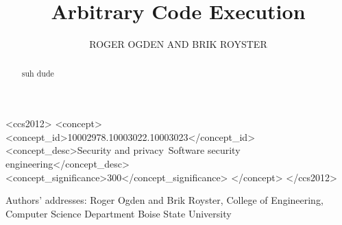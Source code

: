 \documentclass{acmsmall}
\begin{document}

\title{Arbitrary Code Execution}
\author{ROGER OGDEN AND BRIK ROYSTER}

\begin{abstract}
suh dude
\end{abstract}

%
%
\begin{CCSXML}
<ccs2012>
<concept>
<concept_id>10002978.10003022.10003023</concept_id>
<concept_desc>Security and privacy~Software security engineering</concept_desc>
<concept_significance>300</concept_significance>
</concept>
</ccs2012>
\end{CCSXML}


%
%




\begin{bottomstuff}
Authors' addresses: Roger Ogden and Brik Royster,
College of Engineering, Computer Science Department
Boise State University
\end{bottomstuff}

\maketitle











\nocite{*}


\end{document}
